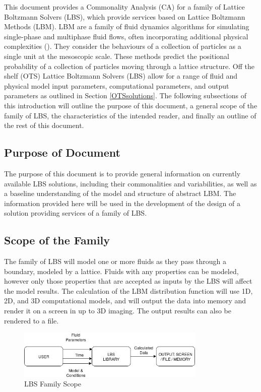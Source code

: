 \documentclass[12pt]{article}
\begin{document}
This document provides a Commonality Analysis (CA) for a family of Lattice Boltzmann Solvers (LBS), which provide services based on Lattice Boltzmann Methods (LBM).
LBM are a family of fluid dynamics algorithms for simulating single-phase and multiphase fluid flows, often incorporating additional physical complexities (\citet{chen1998lattice}). They consider the behaviours of a collection of particles as a single unit at the mesoscopic scale. These methods predict the positional probability of a collection of particles moving through a lattice structure. Off the shelf (OTS) Lattice Boltzmann Solvers (LBS) allow for a range of fluid and physical model input parameters, computational parameters, and output parameters as outlined in Section \ref{OTSsolutions}.
The following subsections of this introduction will outline the purpose of this document, a general scope of the family of LBS, the characteristics of the intended reader, and finally an outline of the rest of this document.

\subsection{Purpose of Document}

The purpose of this document is to provide general information on currently available LBS solutions, including their commonalities and variabilities, as well as a baseline understanding of the model and structure of abstract LBM. The information provided here will be used in the development of the design of a solution providing services of a family of LBS.

\subsection{Scope of the Family} 

The family of LBS will model one or more fluids as they pass through a boundary, modeled by a lattice. Fluids with any properties can be modeled, however only those properties that are accepted as inputs by the LBS will affect the model results. The calculation of the LBM distribution function will use 1D, 2D, and 3D computational models, and will output the data into memory and render it on a screen in up to 3D imaging. The output results can also be rendered to a file.\\

\begin{figure}[h!]
\begin{center}
\includegraphics[width=0.8\textwidth]{SystemContext}
\caption{LBS Family Scope}
\label{Fig_SystemContext}
\end{center}
\end{figure}
\end{document}
